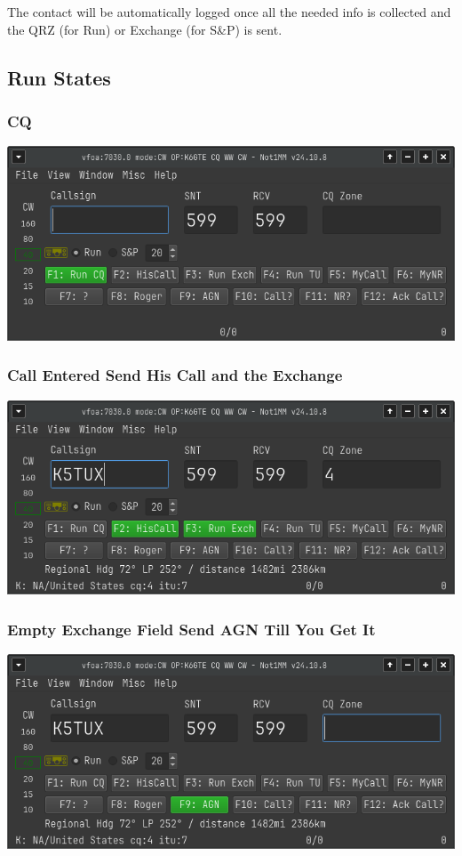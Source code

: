 \documentclass{article}
\begin{document}
The contact will be automatically logged once all the needed info is collected and the QRZ (for Run) or Exchange (for S\&P) is sent.

\subsection{Run States}

\subsubsection{CQ}

\vspace{0.5cm}
\includegraphics[width=0.75\linewidth]{pic/esm_cq.png}

\subsubsection{Call Entered Send His Call and the Exchange}

\vspace{0.5cm}
\includegraphics[width=0.75\linewidth]{pic/esm_withcall.png}

\subsubsection{Empty Exchange Field Send AGN Till You Get It}

\vspace{0.5cm}
\includegraphics[width=0.75\linewidth]{pic/esm_empty_exchange.png}
\end{document}

